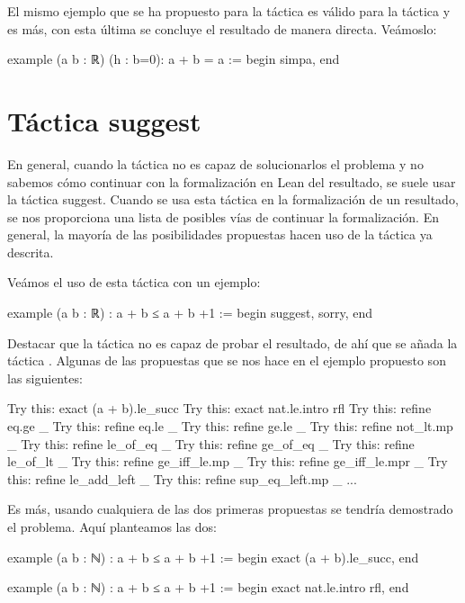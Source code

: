 El mismo ejemplo que se ha propuesto para la táctica  es
válido para la táctica  y es más, con esta última se
concluye el resultado de manera directa. Veámoslo:

\begin{leancode}
example (a b : ℝ) (h : b=0): a + b = a :=
begin
  simpa,
end
\end{leancode}



\section{Táctica suggest}
En general, cuando la táctica  no es
capaz de solucionarlos el problema y no sabemos cómo continuar con la
formalización en Lean del resultado, se suele usar la táctica 
{suggest}. Cuando se usa esta táctica en la formalización de un resultado, se
nos proporciona una lista de posibles vías de continuar la formalización. En
general, la mayoría de las posibilidades propuestas hacen uso de la táctica
 ya descrita.

Veámos el uso de esta táctica con un ejemplo:

\begin{leancode}
example (a b : ℝ) : a + b ≤ a + b +1 :=
begin
  suggest,
  sorry,
end 
\end{leancode}

Destacar que la táctica  no es capaz de probar el
resultado, de ahí que se añada la táctica . Algunas de
las propuestas que se nos hace en el ejemplo propuesto son las siguientes:

\begin{leancode}
Try this: exact (a + b).le_succ
Try this: exact nat.le.intro rfl
Try this: refine eq.ge _
Try this: refine eq.le _
Try this: refine ge.le _
Try this: refine not_lt.mp _
Try this: refine le_of_eq _
Try this: refine ge_of_eq _
Try this: refine le_of_lt _
Try this: refine ge_iff_le.mp _
Try this: refine ge_iff_le.mpr _
Try this: refine le_add_left _
Try this: refine sup_eq_left.mp _
...
\end{leancode}

Es más, usando cualquiera de las dos primeras propuestas se tendría demostrado
el problema. Aquí planteamos las dos:

\begin{leancode}
example (a b : ℕ) : a + b ≤ a + b +1 :=
begin
  exact (a + b).le_succ,
end 

example (a b : ℕ) : a + b ≤ a + b +1 :=
begin
  exact nat.le.intro rfl,
end 
\end{leancode}
